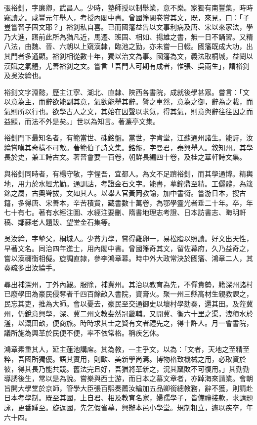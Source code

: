 \begin{pinyinscope}
張裕釗，字廉卿，武昌人。少時，塾師授以制舉業，意不樂。家獨有南豐集，時時竊讀之。咸豐元年舉人，考授內閣中書。曾國籓閱卷賞其文，既，來見，曰：「子豈嘗習子固文耶？」裕釗私自喜。已而國籓益告以文事利病及唐、宋以來家法，學乃大進，寤前此所為猶凡近，馬遷、班固、相如、揚雄之書，無一日不誦習。又精八法，由魏、晉、六朝以上窺漢隸，臨池之勤，亦未嘗一日輟。國籓既成大功，出其門者多通顯。裕釗相從數十年，獨以治文為事。國籓為文，義法取桐城，益閎以漢賦之氣體，尤善裕釗之文。嘗言「吾門人可期有成者，惟張、吳兩生」，謂裕釗及吳汝綸也。

裕釗文字淵懿，歷主江寧、湖北、直隸、陜西各書院，成就後學甚眾。嘗言：「文以意為主，而辭欲能副其意，氣欲能舉其辭。譬之車然，意為之御，辭為之載，而氣則所以行也。欲學古人之文，其始在因聲以求氣，得其氣，則意與辭往往因之而益顯，而法不外是矣。」世以為知言。著濂亭文集。

裕釗門下最知名者，有範當世、硃銘盤。當世，字肯堂，江蘇通州諸生。能詩，汝綸嘗嘆其奇橫不可敵。著範伯子詩文集。銘盤，字曼君，泰興舉人。敘知州。其學長於史，兼工詩古文。著晉會要一百卷，朝鮮長編四十卷，及桂之華軒詩文集。

與裕釗同時者，有楊守敬，字惺吾，宜都人。為文不足躋裕釗，而其學通博。精輿地，用力於水經尤勤。通訓詁，考證金石文字。能書，摹鐘鼎至精。工儷體，為箴銘之屬，古奧聳拔，文如其人。以舉人官黃岡教諭，加中書銜。嘗游日本，搜古籍，多得唐、宋善本，辛苦積貲，藏書數十萬卷，為鄂學靈光者垂二十年。卒，年七十有七。著有水經注圖、水經注要刪、隋書地理志考證、日本訪書志、晦明軒稿、鄰蘇老人題跋、望堂金石集等。

吳汝綸，字摯父，桐城人。少貧力學，嘗得雞卵一，易松脂以照讀。好文出天性，早著文名。同治四年進士，用內閣中書。曾國籓奇其文，留佐幕府，久乃益奇之，嘗以漢禰衡相儗。旋調直隸，參李鴻章幕。時中外大政常決於國籓、鴻章二人，其奏疏多出汝綸手。

尋出補深州，丁外內艱。服除，補冀州。其治以教育為先，不憚貴勢，籍深州諸村已廢學田為豪民侵奪者千四百餘畝入書院，資膏火。聚一州三縣高材生親教課之，民忘其吏，推為大師。會以憂去，豪民至交通御史以壞村學劾奏，還其田。及蒞冀州，仍銳意興學，深、冀二州文教斐然冠畿輔。又開冀、衡六十里之渠，洩積水於滏，以溉田畝，便商旅。時時求其士之賢有文者禮先之，得十許人。月一會書院，議所施為興革於民便不便，率不依常格。稱疾乞休。

鴻章素重其人，延主蓮池講席。其為教，一主乎文，以為：「文者，天地之至精至粹，吾國所獨優。語其實用，則歐、美新學尚焉。博物格致機械之用，必取資於彼，得其長乃能共競。舊法完且好，吾猶將革新之，況其窳敗不可復用。」其勤勤導誘後生，常以是為說。嘗樂與西士游，而日本之慕文章者，亦踔海來請業。會朝旨開大學堂於京師，管學大臣張百熙奏薦汝綸加五品卿銜總教務，辭不獲，則請赴日本考學制。既至其國，上自君、相及教育名家，婦孺學子，皆備禮接款，求請題詠，更番踵至。旋返國，先乞假省墓，興辦本邑小學堂。規制粗立，遽以疾卒，年六十四。


\end{pinyinscope}

